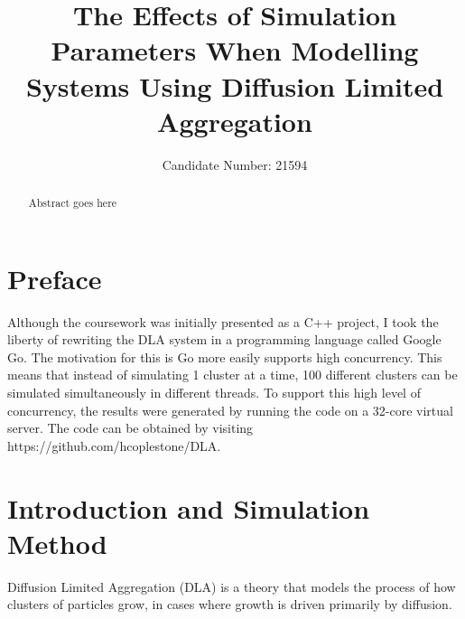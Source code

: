 \documentclass[11pt]{iopart}
\begin{document}
\setlength{\marginparwidth}{1.5cm}

\title[]{The Effects of Simulation Parameters When Modelling Systems Using Diffusion Limited Aggregation}

\author{Candidate Number: 21594}

\address{Department of Physics,
University of Bath, Bath BA2 7AY, United Kingdom}
\begin{abstract}
Abstract goes here
\end{abstract}

\listoftodos


\section*{Preface}
Although the coursework was initially presented as a C++ project, I took the liberty of rewriting the DLA system in a programming language called Google Go. The motivation for this is Go more easily supports high concurrency. This means that instead of simulating 1 cluster at a time, 100 different clusters can be simulated simultaneously in different threads. To support this high level of concurrency, the results were generated by running the code on a 32-core virtual server. The code can be obtained by visiting https://github.com/hcoplestone/DLA.

\section{Introduction and Simulation Method}

Diffusion Limited Aggregation (DLA) is a theory that models the process of how clusters of particles grow, in cases where growth is driven primarily by diffusion. \cite{dla}
\end{document}
